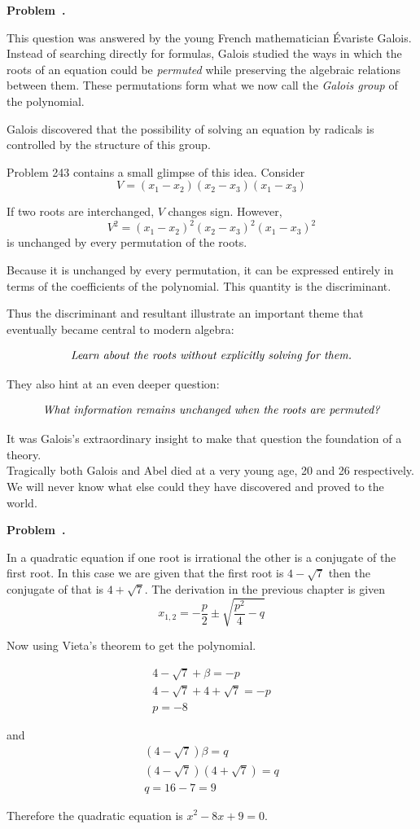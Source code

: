 \documentclass[10pt]{article}
\newcounter{problem}
\newenvironment{problem}[1][]{
  \refstepcounter{problem}
  \par\noindent\textbf{Problem~\theproblem. #1}\par
  \vspace{0.5em}
}{\vspace{1em}}
\begin{document}
\begin{problem}
This question was answered by the young French mathematician \'Evariste Galois. Instead of searching directly for formulas, Galois
studied the ways in which the roots of an equation could be \emph{permuted} while preserving the algebraic relations between
them. These permutations form what we now call the \emph{Galois group} of the polynomial.

Galois discovered that the possibility of solving an equation by radicals is controlled by the structure of this group.

Problem 243 contains a small glimpse of this idea. Consider
\[
V = (x_1 - x_2) (x_2 - x_3) (x_1 - x_3)
\]

If two roots are interchanged, $V$  changes sign. However,
\[
V^2 = (x_1 - x_2)^2 (x_2 - x_3)^2 (x_1 - x_3)^2
\]
is unchanged by every permutation of the roots.

Because it is unchanged by every permutation, it can be expressed entirely in terms of the coefficients of the polynomial. This quantity is the discriminant.

Thus the discriminant and resultant illustrate an important theme that eventually became central to modern algebra:

\[
\text{\emph{Learn about the roots without explicitly solving for them.}}
\]

They also hint at an even deeper question:

\[
\text{\emph{What information remains unchanged when the roots are permuted?}}
\]

It was Galois's extraordinary insight to make that question the foundation of a theory.\\

Tragically both Galois and Abel died at a very young age, 20 and 26 respectively. We will never know what else could they have discovered and proved to the world. 
\end{problem}

\begin{problem} %
  In a quadratic equation if one root is irrational the other is a conjugate of the first root. In this case we are given that 
  the first root is $4 - \sqrt{7}$ then the conjugate of that is $4 + \sqrt{7}$. The derivation in the previous chapter is given 
  \[
  x_{1,2} = -\dfrac{p}{2} \pm \sqrt{\dfrac{p^2}{4} - q}
  \]

  Now using Vieta's theorem to get the polynomial.

  \begin{gather*}
    4 - \sqrt{7} + \beta = -p\\
    4 - \sqrt{7} + 4 + \sqrt{7} = -p\\
    p = -8
  \end{gather*}

  and
  \begin{gather*}
    (4 - \sqrt{7})\beta = q\\
    (4 - \sqrt{7})(4 + \sqrt{7}) = q\\
    q = 16 - 7 = 9
  \end{gather*}

  Therefore the quadratic equation is $x^2 - 8x + 9 = 0$.
\end{problem}
\end{document}
